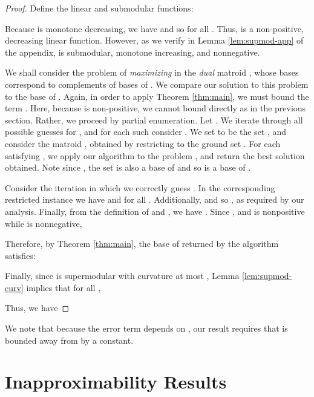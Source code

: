 \documentclass{article}
\theoremstyle{definition}
\begin{document}
\begin{proof}
Define the linear and submodular functions:

Because  is monotone decreasing, we have  and so  for all .  Thus,  is a non-positive, decreasing linear function.  However, as we verify in Lemma \ref{lem:supmod-app} of the appendix,  is submodular, monotone increasing, and nonnegative.

We shall consider the problem of \emph{maximizing}  in the \emph{dual} matroid , whose bases correspond to complements of bases of .  We compare our solution  to this problem to the base  of .  Again, in order to apply Theorem \ref{thm:main}, we must bound the term .  Here, because  is non-positive, we cannot bound  directly as in the previous section.  Rather, we proceed by partial enumeration.  Let .  We iterate through all possible guesses  for , and for each such  consider .  We set  to be the set , and consider the matroid , obtained by restricting  to the ground set .  For each  satisfying , we apply our algorithm to the problem , and return the best solution  obtained.  Note since , the set  is also a base of  and so  is a base of .  

Consider the iteration in which we correctly guess .  In the corresponding restricted instance we have  and  for all .  Additionally,  and so , as required by our analysis.   Finally, from the definition of  and , we have .  Since , and  is nonpositive while  is nonnegative, 

Therefore, by Theorem \ref{thm:main}, the base  of  returned by the algorithm satisfies:

Finally, since  is supermodular with curvature at most , Lemma \ref{lem:supmod-curv} implies that for all ,

Thus, we have

\end{proof}
We note that because the error term depends on , our result requires that  is bounded away from  by a constant.


\section{Inapproximability Results}
\label{sec:inappr-results}
\end{document}
